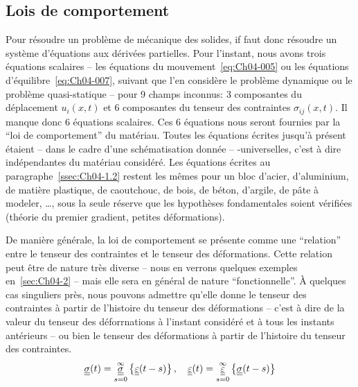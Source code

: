 \subsection{Lois de comportement}  \label{ssec:Ch04-1.3}
Pour résoudre un problème de mécanique des solides, if faut donc résoudre un système d'équations aux dérivées partielles.
Pour l'instant, nous avons trois équations scalaires -- les équations du mouvement~\eqref{eq:Ch04-005} ou les équations d'équilibre~\eqref{eq:Ch04-007}, suivant que l'en considère le problème dynamique ou le problème quasi-statique -- pour 9 champs inconnus: 3 composantes du déplacement $u_i(x,t)$ et 6 composantes du tenseur des contraintes $\sigma_{ij}(x,t)$.
Il manque donc 6 équations scalaires.
Ces 6 équations nous seront fournies par la ``loi de comportement'' du matériau.
Toutes les équations écrites jusqu'à présent étaient -- dans le cadre d'une schématisation donnée -- -universelles, c'est à dire indépendantes du matériau considéré.
Les équations écrites au paragraphe~\ref{ssec:Ch04-1.2} restent les mêmes pour un bloc d'acier, d'aluminium, de matière plastique, de caoutchouc, de bois, de béton, d'argile, de pâte à modeler, \ldots , sous la seule réserve que les hypothèses fondamentales soient vérifiées (théorie du premier gradient, petites déformations).

De manière générale, la loi de comportement se présente comme une ``relation'' entre le tenseur des contraintes et le tenseur des déformations.
Cette relation peut être de nature très diverse -- nous en verrons quelques exemples en~\ref{sec:Ch04-2} -- mais elle sera en général de nature ``fonctionnelle''.
À quelques cas singuliers près, nous pouvons admettre qu'elle donne le tenseur des contraintes à partir de l'histoire du tenseur des déformations -- c'est à dire de la valeur du tenseur des déforrnations à l'instant considéré et à tous les instants antérieurs -- ou bien le tenseur des déformations à partir de l'histoire du tenseur des contraintes.
\begin{equation}
    \underline{\underline{\sigma}} (t) = \mathop{\underline{\underline{\sigma}}}_{s=0}^{\infty} \left\{ \underline{\underline{\varepsilon}} (t-s) \right\}, \quad \underline{\underline{\varepsilon}} (t) = \mathop{\underline{\underline{\varepsilon}}}_{s=0}^{\infty} \left\{ \underline{\underline{\sigma}} (t-s) \right\}
    \label{eq:Ch04-028}
\end{equation}

